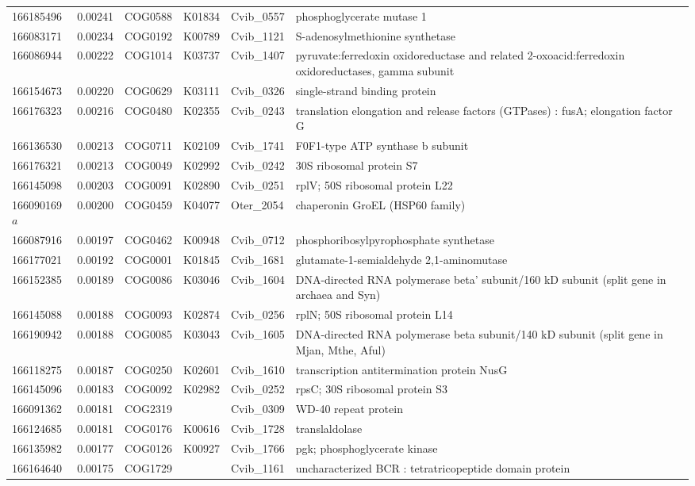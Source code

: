 \begin{landscape}
\begin{longtable}{p{1.8cm}p{0.9cm}p{2.2cm}p{1cm}p{2.8cm}p{13.4cm}}
166185496&0.00241&COG0588&K01834&Cvib\_0557&phosphoglycerate mutase 1 \\
166083171&0.00234&COG0192&K00789&Cvib\_1121&S-adenosylmethionine synthetase \\
166086944&0.00222&COG1014&K03737&Cvib\_1407&pyruvate:ferredoxin oxidoreductase and related 2-oxoacid:ferredoxin oxidoreductases, gamma subunit \\
166154673&0.00220&COG0629&K03111&Cvib\_0326&single-strand binding protein \\
166176323&0.00216&COG0480&K02355&Cvib\_0243&translation elongation and release factors (GTPases) : fusA; elongation factor G \\
166136530&0.00213&COG0711&K02109&Cvib\_1741&F0F1-type ATP synthase b subunit \\
166176321&0.00213&COG0049&K02992&Cvib\_0242&30S ribosomal protein S7 \\
166145098&0.00203&COG0091&K02890&Cvib\_0251&rplV; 50S ribosomal protein L22 \\
166090169$a$&0.00200&COG0459&K04077&Oter\_2054&chaperonin GroEL (HSP60 family) \\
166087916&0.00197&COG0462&K00948&Cvib\_0712&phosphoribosylpyrophosphate synthetase \\
166177021&0.00192&COG0001&K01845&Cvib\_1681&glutamate-1-semialdehyde 2,1-aminomutase \\
166152385&0.00189&COG0086&K03046&Cvib\_1604&DNA-directed RNA polymerase beta' subunit/160 kD subunit (split gene in archaea and Syn) \\
166145088&0.00188&COG0093&K02874&Cvib\_0256&rplN; 50S ribosomal protein L14 \\
166190942&0.00188&COG0085&K03043&Cvib\_1605&DNA-directed RNA polymerase beta subunit/140 kD subunit (split gene in Mjan, Mthe, Aful) \\
166118275&0.00187&COG0250&K02601&Cvib\_1610&transcription antitermination protein NusG \\
166145096&0.00183&COG0092&K02982&Cvib\_0252&rpsC; 30S ribosomal protein S3 \\
166091362&0.00181&COG2319&&Cvib\_0309&WD-40 repeat protein \\
166124685&0.00181&COG0176&K00616&Cvib\_1728&translaldolase \\
166135982&0.00177&COG0126&K00927&Cvib\_1766&pgk; phosphoglycerate kinase \\
166164640&0.00175&COG1729&&Cvib\_1161&uncharacterized BCR : tetratricopeptide domain protein \\

\end{longtable}
\end{landscape}
